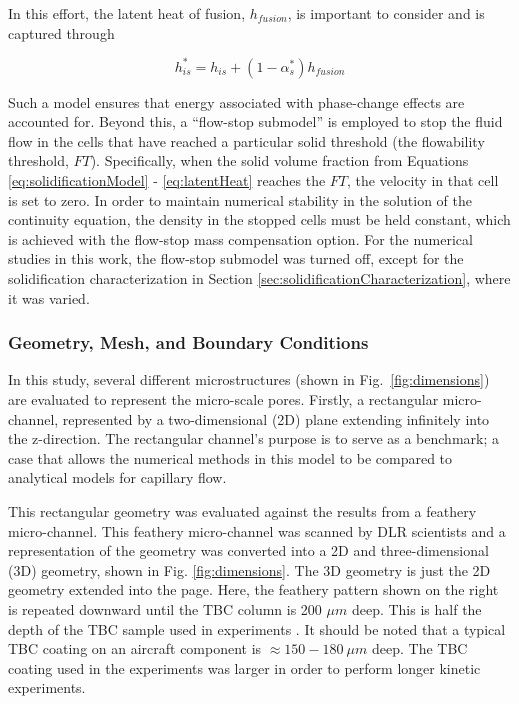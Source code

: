 \documentclass[%
 aip,
 amsmath,amssymb,
 reprint,%
floatfix]{revtex4-1}
\begin{document}
\noindent In this effort, the latent heat of fusion, $h_{fusion}$, is important to consider and is captured through 

\begin{equation}
    h_{is}^{*} = h_{is} + \left( 1 - \alpha_{s}^{*}\right)h_{fusion}
    \label{eq:latentHeat}
\end{equation}

\noindent Such a model ensures that energy associated with phase-change effects are accounted for. Beyond this, a ``flow-stop submodel'' is employed to stop the fluid flow in the cells that have reached a particular solid threshold (the flowability threshold, $FT$). Specifically, when the solid volume fraction from Equations \ref{eq:solidificationModel} - \ref{eq:latentHeat} reaches the $FT$, the velocity in that cell is set to zero. In order to maintain numerical stability in the solution of the continuity equation, the density in the stopped cells must be held constant, which is achieved with the flow-stop mass compensation option. For the numerical studies in this work, the flow-stop submodel was turned off, except for the solidification characterization in Section \ref{sec:solidificationCharacterization}, where it was varied. 

\subsubsection{Geometry, Mesh, and Boundary Conditions}

In this study, several different microstructures (shown in Fig.~\ref{fig:dimensions}) are evaluated to represent the micro-scale pores. Firstly, a rectangular micro-channel, represented by a two-dimensional (2D) plane extending infinitely into the z-direction. The rectangular channel's purpose is to serve as a benchmark; a case that allows the numerical methods in this model to be compared to analytical models for capillary flow. 

This rectangular geometry was  evaluated against the results from a feathery micro-channel. This feathery micro-channel was scanned by DLR scientists \cite{Sirigiri2018} and a representation of the geometry was converted into a 2D and three-dimensional (3D) geometry, shown in Fig. \ref{fig:dimensions}. The 3D geometry is just the 2D geometry extended into the page. Here, the feathery pattern shown on the right is repeated downward until the TBC column is 200 $\mu m$ deep. This is half the depth of the TBC sample used in experiments \cite{Naraparaju2019}. It should be noted that a typical TBC coating on an aircraft component is $\approx 150 - 180~\mu m$ deep. The TBC coating used in the experiments was larger in order to perform longer kinetic experiments. 
\end{document}
